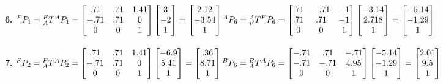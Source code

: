 \documentclass{article}
\begin{document}
\textbf{6. }
${}^FP_1={}^F_AT{}^AP_1=\begin{bmatrix}
.71 & .71 & 1.41\\
-.71 & .71 & 0\\
0 & 0 & 1
\end{bmatrix}\begin{bmatrix}
3\\
-2\\
1
\end{bmatrix}=\begin{bmatrix}
2.12\\
-3.54\\
1
\end{bmatrix}\\\\
{}^AP_6={}^A_FT{}^FP_6=\begin{bmatrix}
.71 & -.71 & -1\\
.71 & .71 & -1\\
0 & 0 & 1
\end{bmatrix}\begin{bmatrix}
-3.14\\
2.718\\
1
\end{bmatrix}=\begin{bmatrix}
-5.14\\
-1.29\\
1
\end{bmatrix}$\\\\
\textbf{7. }
${}^FP_2={}^F_AT{}^AP_2=\begin{bmatrix}
.71 & .71 & 1.41\\
-.71 & .71 & 0\\
0 & 0 & 1
\end{bmatrix}\begin{bmatrix}
-6.9\\
5.41\\
1
\end{bmatrix}=\begin{bmatrix}
.36\\
8.71\\
1
\end{bmatrix}\\\\
{}^BP_6={}^B_AT{}^AP_6=\begin{bmatrix}
-.71 & .71 & -.71\\
-.71 & -.71 & 4.95\\
0 & 0 & 1
\end{bmatrix}\begin{bmatrix}
-5.14\\
-1.29\\
1
\end{bmatrix}=\begin{bmatrix}
2.01\\
9.5\\
1
\end{bmatrix}$\\\\
\end{document}
